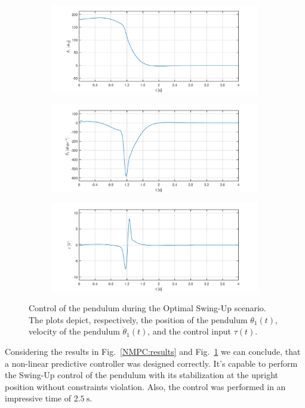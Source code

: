 \begin{figure}[H]
	\centering
	\begin{subfigure}
		\centering
		\includegraphics[scale=0.6]{images/Oswing/pend.pdf}  
	\end{subfigure}
	\begin{subfigure}
		\centering
		\includegraphics[scale=0.6]{images/Oswing/dpend.pdf}  
	\end{subfigure}
	\begin{subfigure}
		\centering
		\includegraphics[scale=0.6]{images/Oswing/control.pdf}  
	\end{subfigure}
	\caption{Control of the pendulum during the Optimal Swing-Up scenario. The plots depict, respectively, the position of the pendulum $\theta_1(t)$, velocity of the pendulum $\dot{\theta}_1(t)$, and the control input $\tau(t)$.}
	\label{NMPC:results1}
\end{figure}
Considering the results in Fig.~\ref{NMPC:results} and Fig.~\ref{NMPC:results1} we can conclude, that a non-linear predictive controller was designed correctly. It's capable to perform the Swing-Up control of the pendulum with its stabilization at the upright position without constraints violation. Also, the control was performed in an impressive time of $\SI{2.5}{\second}$.
